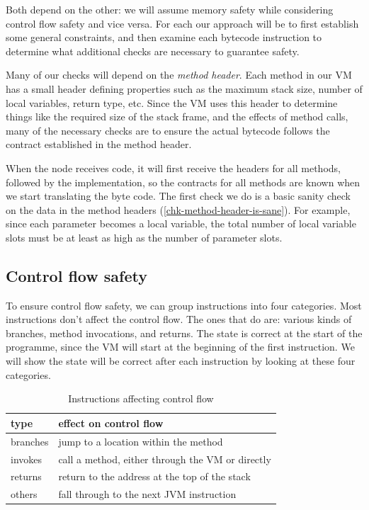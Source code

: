 Both depend on the other: we will assume memory safety while considering control flow safety and vice versa. For each our approach will be to first establish some general constraints, and then examine each bytecode instruction to determine what additional checks are necessary to guarantee safety.

Many of our checks will depend on the \emph{method header}. Each method in our VM has a small header defining properties such as the maximum stack size, number of local variables, return type, etc. Since the VM uses this header to determine things like the required size of the stack frame, and the effects of method calls, many of the necessary checks are to ensure the actual bytecode follows the contract established in the method header.

When the node receives code, it will first receive the headers for all methods, followed by the implementation, so the contracts for all methods are known when we start translating the byte code. The first check we do is a basic sanity check on the data in the method headers (\ref{chk-method-header-is-sane}). For example, since each parameter becomes a local variable, the total number of local variable slots must be at least as high as the number of parameter slots.


\subsection{Control flow safety}
To ensure control flow safety, we can group instructions into four categories. Most instructions don't affect the control flow. The ones that do are: various kinds of branches, method invocations, and returns. The state is correct at the start of the programme, since the VM will start at the beginning of the first instruction. We will show the state will be correct after each instruction by looking at these four categories.

\begin{table}[H]
\centering
\caption{Instructions affecting control flow}
\label{tbl-control-flow-instructions}
\begin{tabular}{ll}
\toprule
type     & effect on control flow \\
\midrule
branches & jump to a location within the method \\
invokes  & call a method, either through the VM or directly \\
returns  & return to the address at the top of the stack \\
others   & fall through to the next JVM instruction \\
\bottomrule
\end{tabular}
\end{table}

